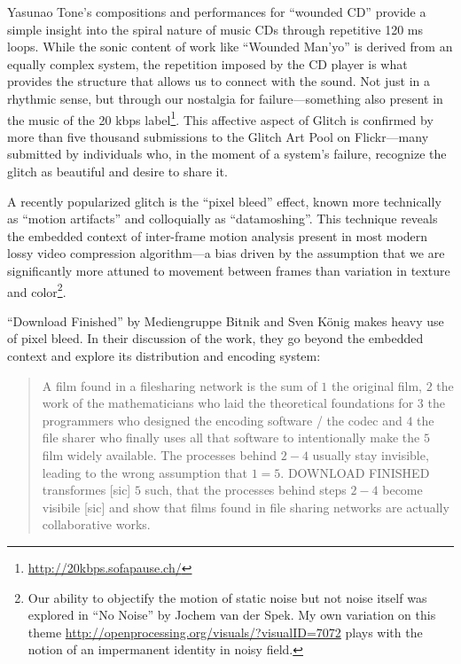 \documentclass{thesis}
\begin{document}
Yasunao Tone's compositions and performances for ``wounded CD''\cite{media_art_net_media_2010} provide a simple insight into the spiral nature of music CDs through repetitive 120 ms loops. While the sonic content of work like ``Wounded Man'yo'' is derived from an equally complex system, the repetition imposed by the CD player is what provides the structure that allows us to connect with the sound. Not just in a rhythmic sense, but through our nostalgia for failure---something also present in the music of the 20 kbps label\footnote{\url{http://20kbps.sofapause.ch/}}. This affective aspect of Glitch is confirmed by more than five thousand submissions to the Glitch Art Pool on Flickr\cite{liminalmike_flickr:glitch_????}---many submitted by individuals who, in the moment of a system's failure, recognize the glitch as beautiful and desire to share it.
	
A recently popularized glitch is the ``pixel bleed''\cite{john_michael_boling_rhizome_????} effect, known more technically as ``motion artifacts'' and colloquially as ``datamoshing''. This technique reveals the embedded context of inter-frame motion analysis present in most modern lossy video compression algorithm---a bias driven by the assumption that we are significantly more attuned to movement between frames than variation in texture and color\footnote{Our ability to objectify the motion of static noise but not noise itself was explored in ``No Noise''\cite{jochem_van_der_spek_no_2001} by Jochem van der Spek. My own variation on this theme \url{http://openprocessing.org/visuals/?visualID=7072} plays with the notion of an impermanent identity in noisy field.}.

``Download Finished'' by Mediengruppe Bitnik and Sven K\"onig\cite{!mediengruppe_bitnik_and_sven_knig_download_????}  makes heavy use of pixel bleed. In their discussion of the work, they go beyond the embedded context and explore its distribution and encoding system:

	\begin{quote}
	A film found in a filesharing network is the sum of $1$ the original film, $2$ the work of the mathematicians who laid the theoretical foundations for $3$ the programmers who designed the encoding software / the codec and $4$ the file sharer who finally uses all that software to intentionally make the $5$ film widely available. The processes behind $2-4$ usually stay invisible, leading to the wrong assumption that $1=5$. DOWNLOAD FINISHED transformes [sic] $5$ such, that the processes behind steps $2-4$ become visibile [sic] and show that films found in file sharing networks are actually collaborative works.
	\end{quote}
	
\end{document}

